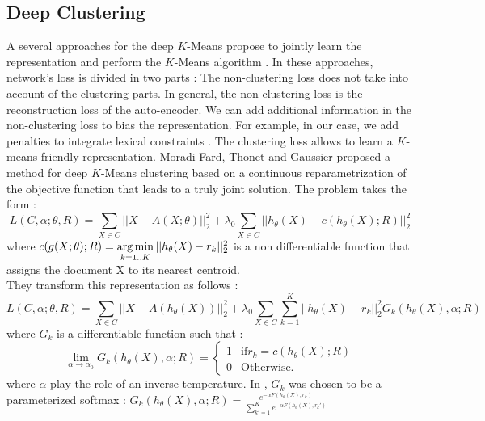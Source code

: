 \subsection{\label{seq:DeepClust}Deep Clustering}
A several approaches for the deep $K$-Means propose to jointly learn the
representation and perform the $K$-Means algorithm \cite{2018arXiv180107648A}.
In these approaches, network's loss is divided in two parts :
The non-clustering loss does not
take into account of the clustering parts. In general, the non-clustering 
loss is the reconstruction loss of the auto-encoder. We can add additional 
information in the non-clustering loss to bias the representation. For
example, in our case, we add penalties to integrate lexical constraints
.
The clustering loss allows to learn a  $K$-means friendly representation.
Moradi Fard, Thonet and Gaussier \cite{Deap-K-Means} proposed a method for deep $K$-Means 
clustering based on a continuous reparametrization of the objective function 
that leads to a truly joint solution. 
The problem takes the form : 
\begin{equation}
L(C ,\alpha;\theta,R) = \sum\limits_{X \in C} ||X - A(X;\theta)||_2^2 + 
\lambda_0 \sum\limits_{X \in C}||h_\theta(X) - c(h_\theta(X); R) ||_2^2
\end{equation}
where $c(g(X; \theta); R) = \operatorname*{arg\,min}\limits_{k = 1 .. K} || h_\theta(X) - r_k||_2^2$
is a non differentiable function that assigns the document X
to its nearest centroid.\\
They transform this representation as follows :
\begin{equation}
L(C ,\alpha;\theta,R) = \sum\limits_{X \in C} ||X - A(h_\theta(X))||_2^2 + 
\lambda_0 \sum\limits_{X \in C}\sum\limits_{k=1}^K||h_\theta(X) - r_k ||_2^2 G_{k}(h_\theta(X), \alpha; R) 
\end{equation}
where $G_{k}$ is a differentiable function such that :
\begin{equation}
  \lim\limits_{\alpha \rightarrow \alpha_0}G_{k}(h_\theta(X), \alpha; R) = \left\{
\begin{array}{ll}
  1 & \mbox{if} r_k = c(h_\theta(X); R)\\
  0 & \mbox{Otherwise.}
\end{array}
\right.
\end{equation}
where $\alpha$ play the role of an inverse temperature. In \cite{Deap-K-Means}
, $G_{k}$ was chosen to be a parameterized softmax : 
$G_{k}(h_\theta(X), \alpha; R) = \frac{e^{-\alpha F(h_\theta(X),r_k)}}
{\sum\limits_{k' = 1}^K e^{-\alpha F(h_\theta(X),r_k')}}$\\
